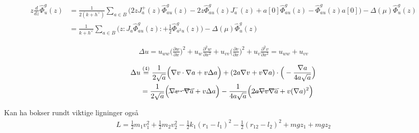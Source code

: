         \footnotesize %
        \begin{adjustwidth}{-4cm}{-4cm}
            \centering
            \begin{align*}
                z\frac{d}{dz} \hat{\Phi}^g_u(z) &= \frac{1}{2(k+h^\vee)}\sum_{a\in B} \Big(2zJ^+_a(z)\hat{\Phi}^g_{au}(z) - 2z\hat{\Phi}^g_{au}(z)J^-_a(z) + a[0]\hat{\Phi}^g_{au}(z) - \hat{\Phi}^g_{au}(z)a[0]\Big) - \Delta(\mu)\hat{\Phi}^g_{u}(z)
                \\ &= \frac{1}{k+h^\vee} \sum_{a\in B} \Big(z : J_a \hat{\Phi}^g_{au}(z): + \frac{1}{2}\hat{\Phi}^g_{a^2u}(z)\Big) - \Delta(\mu)\hat{\Phi}^g_{u}(z)
            \end{align*}
        \end{adjustwidth}
        
        
        \normalsize %
        \begin{align*}
            \Delta u= u_{ww} \Big( \frac{\partial w}{\partial x} \Big) ^2 + u_w \frac{\partial ^2 w}{\partial x^2}+u_{vv} \Big( \frac{\partial v}{\partial x} \Big) ^2 + u_v \frac{\partial ^2 v}{\partial x^2} = u_{ww}+u_{vv}
        \end{align*}
            
        \begin{align} 
            \Delta u &\stackrel{(4)}{=} \frac{1}{2\sqrt{a}} \Big(\nabla v \cdot \nabla a + v\Delta a\Big) + (2a\nabla v + v\nabla a) \cdot \Big(-\frac{\nabla a}{4a\sqrt{a}}\Big)
            \\ &= \frac{1}{2\sqrt{a}} \Big(\cancel{\nabla v \cdot \nabla a} + v\Delta a\Big) -\frac{1}{4a\sqrt{a}}\Big(\cancel{2a\nabla v\nabla a} + v(\nabla a)^2\Big)
        \end{align}    
            
            
        Kan ha bokser rundt viktige ligninger også
        \begin{align}
            \boxed{L = \frac{1}{2}m_1v_1^2 + \frac{1}{2}m_2v_2^2 
            - \frac{1}{2}k_1(r_1 - l_1)^2 - \frac{1}{2}(r_{12}-l_2)^2 + mgz_1 + mgz_2}
        \end{align}
            
